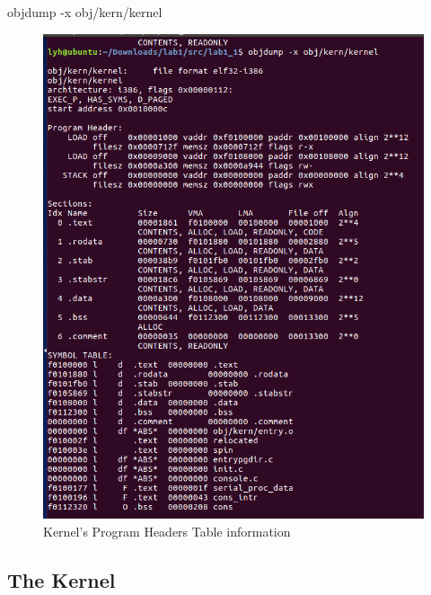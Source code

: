 {\color{red} objdump -x obj/kern/kernel}
\begin{figure}[H]
  \centering
  \includegraphics[width=0.8\linewidth]{figure/kernel_table}
  \caption{Kernel's Program Headers Table information}\label{2}
\end{figure}

\subsection{The Kernel}
